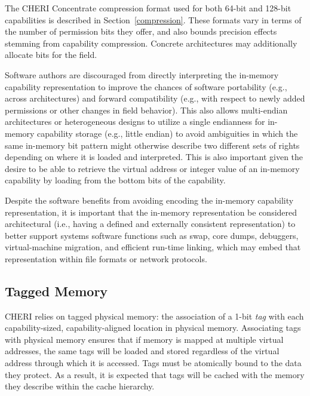 The CHERI Concentrate compression format used for both 64-bit and 128-bit
capabilities is described in Section~\ref{compression}.
These formats vary in terms of the number of permission bits they offer, and
also bounds precision effects stemming from capability compression. Concrete
architectures may additionally allocate bits for the \cflags{} field.

Software authors are discouraged from directly interpreting the in-memory
capability representation to improve the chances of software portability
(e.g., across architectures) and forward compatibility (e.g., with respect to
newly added permissions or other changes in field behavior).
This also allows multi-endian architectures or heterogeneous designs to utilize
a single endianness for in-memory capability storage (e.g., little endian) to
avoid ambiguities in which the same in-memory bit pattern might otherwise
describe two different sets of rights depending on where it is loaded and
interpreted.
This is also important given the desire to be able to retrieve the virtual
address or integer value of an in-memory capability by loading from the bottom
\xlen{} bits of the capability.

Despite the software benefits from avoiding encoding the in-memory capability
representation, it is important that the in-memory representation be
considered architectural (i.e., having a defined and externally consistent
representation) to better support systems software functions such as swap,
core dumps, debuggers, virtual-machine migration, and efficient run-time
linking, which may embed that representation within file formats or network
protocols.

\subsection{Tagged Memory}
\label{sec:tagged-memory}

CHERI relies on tagged physical memory: the association of a 1-bit {\em tag}
with each capability-sized, capability-aligned location in physical memory.
Associating tags with physical memory ensures that if memory is mapped at
multiple virtual addresses, the same tags will be loaded and stored regardless
of the virtual address through which it is accessed.
Tags must be atomically bound to the data they protect.
As a result, it is expected that tags will be cached with the memory they describe within the cache hierarchy.

